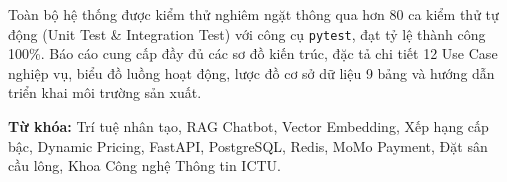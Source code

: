 Toàn bộ hệ thống được kiểm thử nghiêm ngặt thông qua hơn 80 ca kiểm thử tự động (Unit Test \& Integration Test) với công cụ \texttt{pytest}, đạt tỷ lệ thành công 100\%. Báo cáo cung cấp đầy đủ các sơ đồ kiến trúc, đặc tả chi tiết 12 Use Case nghiệp vụ, biểu đồ luồng hoạt động, lược đồ cơ sở dữ liệu 9 bảng và hướng dẫn triển khai môi trường sản xuất.

\vspace{1.0cm}
\noindent\textbf{Từ khóa:} Trí tuệ nhân tạo, RAG Chatbot, Vector Embedding, Xếp hạng cấp bậc, Dynamic Pricing, FastAPI, PostgreSQL, Redis, MoMo Payment, Đặt sân cầu lông, Khoa Công nghệ Thông tin ICTU.

\clearpage
